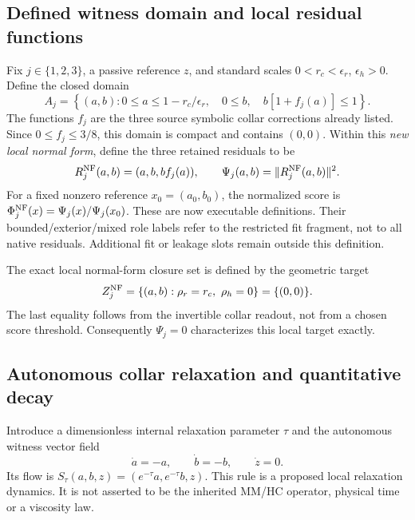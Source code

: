 \documentclass[11pt,a4paper]{article}
\begin{document}
\subsection{Defined witness domain and local residual functions}
Fix $j\in\{1,2,3\}$, a passive reference $z$, and standard scales
$0<r_c<\epsilon_r$, $\epsilon_h>0$. Define the closed domain
\[
A_j=\left\{(a,b):0\le a\le1-r_c/\epsilon_r,\quad
0\le b,\quad b[1+f_j(a)]\le1\right\}.
\]
The functions $f_j$ are the three source symbolic collar corrections already
listed. Since $0\le f_j\le3/8$, this domain is compact and contains $(0,0)$.
Within this \emph{new local normal form}, define the three retained residuals
to be
\[
R^{\rm NF}_j(a,b)=(a,b,bf_j(a)),\qquad
\Psi_j(a,b)=\|R^{\rm NF}_j(a,b)\|^2.
\]
For a fixed nonzero reference $x_0=(a_0,b_0)$, the normalized score is
$\Phi^{\rm NF}_j(x)=\Psi_j(x)/\Psi_j(x_0)$.
These are now executable definitions. Their bounded/exterior/mixed role
labels refer to the restricted fit fragment, not to all native residuals.
Additional fit or leakage slots remain outside this definition.

The exact local normal-form closure set is defined by the geometric target
\[
Z_j^{\rm NF}=\{(a,b):\rho_r=r_c,\ \rho_h=0\}=\{(0,0)\}.
\]
The last equality follows from the invertible collar readout, not from a
chosen score threshold. Consequently $\Psi_j=0$ characterizes this local
target exactly.

\subsection{Autonomous collar relaxation and quantitative decay}
Introduce a dimensionless internal relaxation parameter $\tau$ and the
autonomous witness vector field
\[
\dot a=-a,\qquad\dot b=-b,\qquad\dot z=0.
\]
Its flow is $S_\tau(a,b,z)=(e^{-\tau}a,e^{-\tau}b,z)$.
This rule is a proposed local relaxation dynamics. It is not asserted to
be the inherited MM/HC operator, physical time or a viscosity law.
\end{document}
